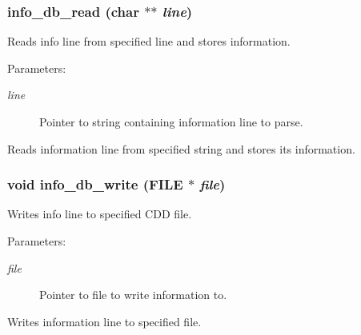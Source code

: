 \subsubsection{ info\_\-db\_\-read (char $\ast$$\ast$ {\em line})}\label{info_8h_a1}


Reads info line from specified line and stores information.

\begin{Desc}
\item[Parameters: ]\par
\begin{description}
\item[{\em 
line}]Pointer to string containing information line to parse.\end{description}
\end{Desc}
Reads information line from specified string and stores its information. 
\subsubsection{\setlength{\rightskip}{0pt plus 5cm}void info\_\-db\_\-write (FILE $\ast$ {\em file})}\label{info_8h_a0}


Writes info line to specified CDD file.

\begin{Desc}
\item[Parameters: ]\par
\begin{description}
\item[{\em 
file}]Pointer to file to write information to.\end{description}
\end{Desc}
Writes information line to specified file. 